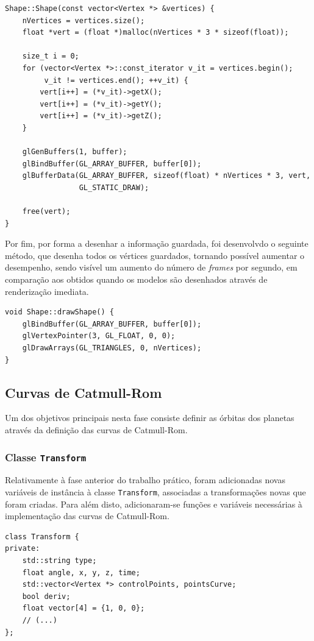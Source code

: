 \documentclass[a4paper, 11pt]{article}
\begin{document}
\begin{verbatim}
Shape::Shape(const vector<Vertex *> &vertices) {
    nVertices = vertices.size();
    float *vert = (float *)malloc(nVertices * 3 * sizeof(float));

    size_t i = 0;
    for (vector<Vertex *>::const_iterator v_it = vertices.begin();
         v_it != vertices.end(); ++v_it) {
        vert[i++] = (*v_it)->getX();
        vert[i++] = (*v_it)->getY();
        vert[i++] = (*v_it)->getZ();
    }

    glGenBuffers(1, buffer);
    glBindBuffer(GL_ARRAY_BUFFER, buffer[0]);
    glBufferData(GL_ARRAY_BUFFER, sizeof(float) * nVertices * 3, vert,
                 GL_STATIC_DRAW);

    free(vert);
}
\end{verbatim}

Por fim, por forma a desenhar a informação guardada, foi desenvolvdo o seguinte método, que 
desenha todos os vértices guardados, tornando possível aumentar o desempenho, sendo visível um 
aumento do número de \textit{frames} por segundo, em comparação aos obtidos quando os modelos 
são desenhados através de renderização imediata.

\begin{verbatim}
void Shape::drawShape() {
    glBindBuffer(GL_ARRAY_BUFFER, buffer[0]);
    glVertexPointer(3, GL_FLOAT, 0, 0);
    glDrawArrays(GL_TRIANGLES, 0, nVertices);
}
\end{verbatim}

\subsection{Curvas de Catmull-Rom}

Um dos objetivos principais nesta fase consiste definir as órbitas dos planetas através da 
definição das curvas de Catmull-Rom.

\subsubsection{Classe \texttt{Transform}}

Relativamente à fase anterior do trabalho prático, foram adicionadas novas variáveis de 
instância à classe \texttt{Transform}, associadas a transformações novas que foram criadas. 
Para além disto, adicionaram-se funções e variáveis necessárias à implementação das curvas 
de Catmull-Rom.

\begin{verbatim}
class Transform {
private:
    std::string type;
    float angle, x, y, z, time;
    std::vector<Vertex *> controlPoints, pointsCurve;
    bool deriv;
    float vector[4] = {1, 0, 0};
    // (...)
};
\end{verbatim}
\end{document}
